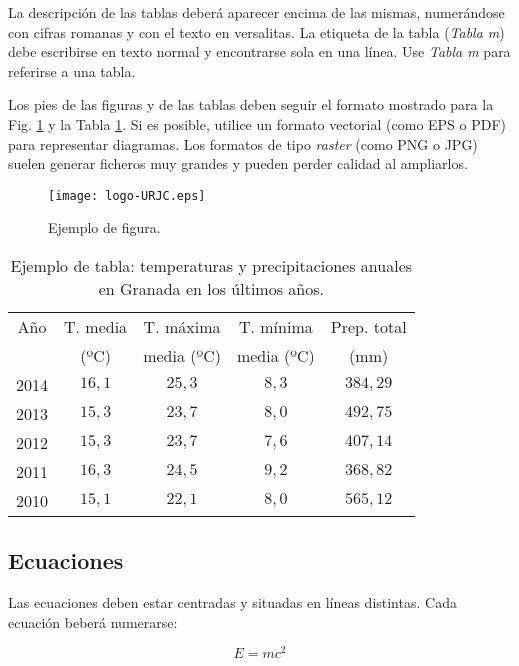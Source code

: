 \documentclass[10pt,conference,a4paper]{IEEEtran}
\begin{document}
{ La descripción de las tablas deberá aparecer encima de las mismas, numerándose con cifras romanas y con el 
 texto en versalitas. La etiqueta de la tabla ({\it Tabla m}) debe escribirse en texto normal y encontrarse 
 sola en una línea. Use {\it Tabla m} para referirse a una tabla.

Los pies de las figuras y de las tablas deben seguir el formato mostrado para la Fig. \ref{fig:logoURJC} 
y  la Tabla \ref{tab:ejtabla}. Si es posible, utilice un formato vectorial (como EPS o PDF) para representar 
diagramas. Los formatos de tipo {\em raster} (como PNG o JPG) suelen generar ficheros muy grandes y pueden 
perder calidad al ampliarlos.

\begin{figure}[t]
\centerline{
\texttt{[image: logo-URJC.eps]}
}
\caption{Ejemplo de figura.}
\label{fig:logoURJC}
\end{figure}

\begin{table}[b]
\centering
\caption{Ejemplo de tabla: temperaturas y precipitaciones anuales en Granada en los últimos años.}
\label{tab:ejtabla}
\begin{tabular}{c c c c c}
\hline
\hline
 Año & T. media & T. máxima     &     T. mínima       & Prep. total  \\ 
        &    (ºC)     &  media  (ºC)   &      media  (ºC)   &      (mm)     \\
\hline
 2014 & $16,1$  & $25,3$ & $8,3$ & $384,29$ \\
 2013 & $15,3$  & $23,7$ & $8,0$ & $492,75$ \\
 2012 & $15,3$  & $23,7$ & $7,6$ & $407,14$ \\
 2011 & $16,3$  & $24,5$ & $9,2$ & $368,82$ \\
 2010 & $ 15,1$ & $22,1$ & $8,0$ & $565,12$ \\
\hline
\hline
\end{tabular}
\end{table}


\subsection{Ecuaciones}

Las ecuaciones deben estar centradas y situadas en líneas distintas. Cada ecuación beberá numerarse:

\begin{equation}
E = mc^2
\label{eq:emc2}
\end{equation}

}
\end{document}

